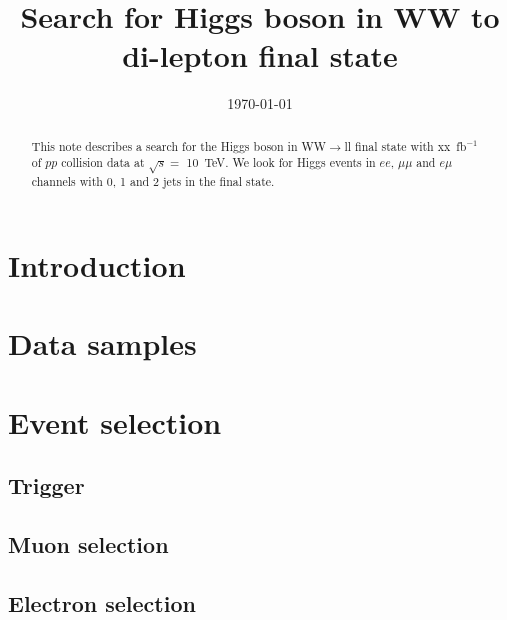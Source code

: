 \documentclass{cmspaper}
\begin{document}
\begin{titlepage}


  \date{\today}

  \title{Search for Higgs boson in WW to di-lepton final state}

  \begin{Authlist}
  \end{Authlist}


  \begin{abstract}
    This note describes a search for the Higgs boson in WW$\to$ll
    final state with xx~fb$^{-1}$ of $pp$ collision data at $\sqrt s =
    $ 10~TeV. We look for Higgs events in $ee$, $\mu\mu$ and $e\mu$
    channels with 0, 1 and 2 jets in the final state.
  \end{abstract} 

\end{titlepage}
\tableofcontents
\newpage 

\section{Introduction}
  \label{sec:overview}
%  
\section{Data samples}
  \label{sec:dataset}
%  
\section{Event selection}
  \label{sec:selection} 
%  
  \subsection{Trigger}
    \label{sec:sel_trigger}
    
  \subsection{Muon selection} 
    \label{sec:sel_muons}
%    
  \subsection{Electron selection} 
    \label{sec:sel_electrons}
%    
\end{document}
